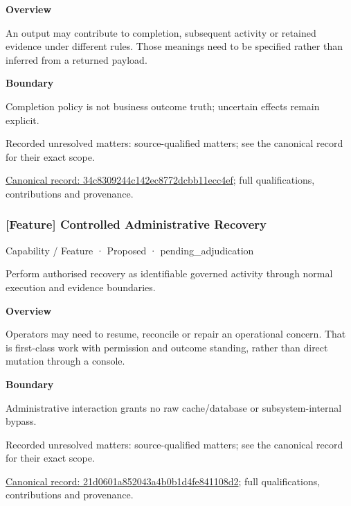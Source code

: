 \textbf{Overview}



An output may contribute to completion, subsequent activity or retained evidence under different rules. Those meanings need to be specified rather than inferred from a returned payload.



\textbf{Boundary}



Completion policy is not business outcome truth; uncertain effects remain explicit.


{\small Recorded unresolved matters: source-qualified matters; see the canonical record for their exact scope.}\par
{\footnotesize \href{../../../../continuum/strategy/capability/feature/34c8309244c142ec8772dcbb11ecc4ef.md}{Canonical record: 34c8309244c142ec8772dcbb11ecc4ef}; full qualifications, contributions and provenance.}\par
\subsubsection{[Feature] Controlled Administrative Recovery}

\label{element:21d0601a852043a4b0b1d4fe841108d2}
{\small Capability / Feature · Proposed · pending\_adjudication}\par

Perform authorised recovery as identifiable governed activity through normal execution and evidence boundaries.



\textbf{Overview}



Operators may need to resume, reconcile or repair an operational concern. That is first-class work with permission and outcome standing, rather than direct mutation through a console.



\textbf{Boundary}



Administrative interaction grants no raw cache/database or subsystem-internal bypass.


{\small Recorded unresolved matters: source-qualified matters; see the canonical record for their exact scope.}\par
{\footnotesize \href{../../../../continuum/strategy/capability/feature/21d0601a852043a4b0b1d4fe841108d2.md}{Canonical record: 21d0601a852043a4b0b1d4fe841108d2}; full qualifications, contributions and provenance.}\par
